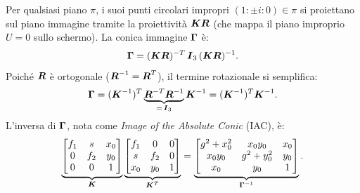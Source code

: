 Per qualsiasi piano \(\pi\), i suoi punti circolari impropri
\((1:\pm i:0)\in\pi\) si proiettano sul piano immagine tramite la
proiettività \(\boldsymbol{K}\boldsymbol{R}\) (che mappa il piano improprio
\(U=0\) sullo schermo). La conica immagine \(\boldsymbol{\Gamma}\) è:
\[
  \boldsymbol{\Gamma} = (\boldsymbol{K}\boldsymbol{R})^{-T}\,\boldsymbol{I}_3\,(\boldsymbol{K}\boldsymbol{R})^{-1}.
\]
Poiché \(\boldsymbol{R}\) è ortogonale (\(\boldsymbol{R}^{-1}=\boldsymbol{R}^T\)),
il termine rotazionale si semplifica:
\[
  \boldsymbol{\Gamma}
  = (\boldsymbol{K}^{-1})^T \underbrace{\boldsymbol{R}^{-T}\boldsymbol{R}^{-1}}_{=\,\boldsymbol{I}_3} \boldsymbol{K}^{-1}
  = (\boldsymbol{K}^{-1})^T \boldsymbol{K}^{-1}.
\]
L'inversa di \(\boldsymbol{\Gamma}\), nota come
\emph{Image of the Absolute Conic} (IAC), è:
\[
  \underbrace{
  \begin{bmatrix}
    f_1 & s   & x_0 \\
    0   & f_2 & y_0 \\
    0   & 0   & 1
  \end{bmatrix}
  }_{\boldsymbol{K}}
  \underbrace{
  \begin{bmatrix}
    f_1 & 0   & 0 \\
    s   & f_2 & 0 \\
    x_0 & y_0 & 1
  \end{bmatrix}
  }_{\boldsymbol{K}^T}
  =
  \underbrace{
  \begin{bmatrix}
    g^2 + x_0^2 & x_0 y_0     & x_0 \\
    x_0 y_0     & g^2 + y_0^2 & y_0 \\
    x_0         & y_0         & 1
  \end{bmatrix}
  }_{\boldsymbol{\Gamma}^{-1}}.
\]


